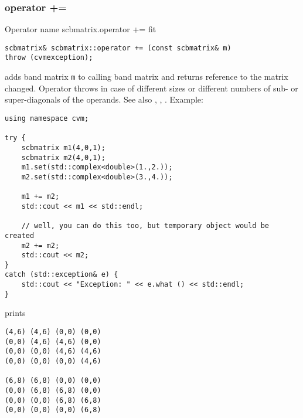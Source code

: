 \subsubsection{operator +=}
Operator%
\pdfdest name {scbmatrix.operator +=} fit
\begin{verbatim}
scbmatrix& scbmatrix::operator += (const scbmatrix& m) 
throw (cvmexception);
\end{verbatim}
adds  band matrix \verb"m" to  calling band matrix 
and returns  reference to
the matrix changed.
Operator throws  
in case of different sizes or different numbers of sub- or super-diagonals
of the operands.
See also ,
,
.
Example:
\begin{Verbatim}
using namespace cvm;

try {
    scbmatrix m1(4,0,1);
    scbmatrix m2(4,0,1);
    m1.set(std::complex<double>(1.,2.));
    m2.set(std::complex<double>(3.,4.));

    m1 += m2;
    std::cout << m1 << std::endl;

    // well, you can do this too, but temporary object would be created
    m2 += m2; 
    std::cout << m2;
}
catch (std::exception& e) {
    std::cout << "Exception: " << e.what () << std::endl;
}
\end{Verbatim}
prints
\begin{Verbatim}
(4,6) (4,6) (0,0) (0,0)
(0,0) (4,6) (4,6) (0,0)
(0,0) (0,0) (4,6) (4,6)
(0,0) (0,0) (0,0) (4,6)

(6,8) (6,8) (0,0) (0,0)
(0,0) (6,8) (6,8) (0,0)
(0,0) (0,0) (6,8) (6,8)
(0,0) (0,0) (0,0) (6,8)
\end{Verbatim}
\newpage




